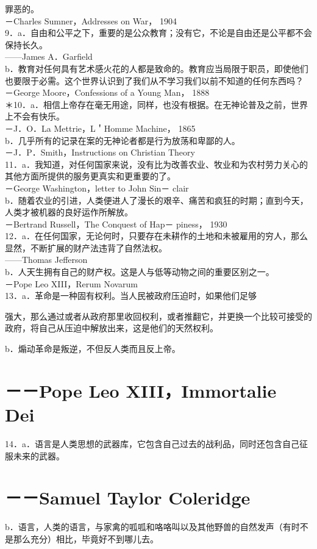 罪恶的。\\
－Charles Sumner，Addresses on War， 1904\\
9．a．自由和公平之下，重要的是公众教育；没有它，不论是自由还是公平都不会保持长久。\\
——James A．Garfield\\
b．教育对任何具有艺术感火花的人都是致命的。教育应当局限于职员，即使他们也要限于必需。这个世界认识到了我们从不学习我们以前不知道的任何东西吗？\\
－George Moore，Confessions of a Young Man， 1888\\
＊10．a．相信上帝存在毫无用途，同样，也没有根据。在无神论普及之前，世界上不会有快乐。\\
－J．O．La Mettrie，L＇Homme Machine， 1865\\
b．几乎所有的记录在案的无神论者都是行为放荡和卑鄙的人。\\
－J．P．Smith，Instructions on Christian Theory\\
11．a．我知道，对任何国家来说，没有比为改善农业、牧业和为农村劳力关心的其他方面所提供的服务更真实和更重要的了。\\
－George Washington，letter to John Sin－ clair\\
b．随着农业的引进，人类便进人了漫长的艰辛、痛苦和疯狂的时期；直到今天，人类才被机器的良好运作所解放。\\
－Bertrand Russell，The Conquest of Hap－ piness， 1930\\
12．a．在任何国家，无论何时，只要存在未耕作的土地和未被雇用的穷人，那么显然，不断扩展的财产法违背了自然法权。\\
——Thomas Jefferson\\
b．人天生拥有自己的财产权。这是人与低等动物之间的重要区别之一。\\
－Pope Leo XIII，Rerum Novarum\\
13．a．革命是一种固有权利。当人民被政府压迫时，如果他们足够

强大，那么通过或者从政府那里收回权利，或者推翻它，并更换一个比较可接受的政府，将自己从压迫中解放出来，这是他们的天然权利。

b．煽动革命是叛逆，不但反人类而且反上帝。

\section*{－－Pope Leo XIII，Immortalie Dei}
14．a．语言是人类思想的武器库，它包含自己过去的战利品，同时还包含自己征服未来的武器。

\section*{－－Samuel Taylor Coleridge}
b．语言，人类的语言，与家禽的呱呱和咯咯叫以及其他野兽的自然发声（有时不是那么充分）相比，毕竟好不到哪儿去。

